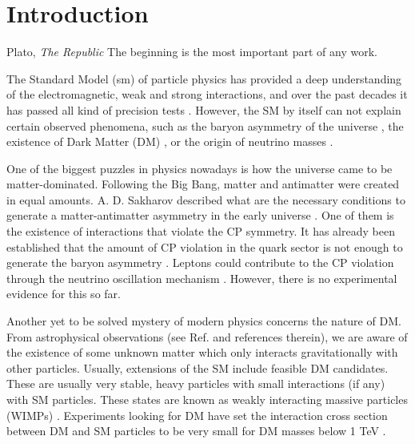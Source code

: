 \chapter{Introduction}
\label{chapter:introduction}


\begin{chapquote}{Plato, \textit{The Republic}}
	The beginning is the most important part of any work.
\end{chapquote}

The Standard Model (\gls{sm}) of particle physics \cite{Glashow1961,Weinberg1967,Salam1968} has provided a deep understanding of the electromagnetic, weak and strong interactions, and over the past decades it has passed all kind of precision tests \cite{Erler2019}. However, the SM by itself can not explain certain observed phenomena, such as the baryon asymmetry of the universe \cite{Canetti2012}, the existence of Dark Matter (DM) \cite{Bertone2004}, or the origin of neutrino masses \cite{King2014}.

One of the biggest puzzles in physics nowadays is how the universe came to be matter-dominated. Following the Big Bang, matter and antimatter were created in equal amounts. A. D. Sakharov described what are the necessary conditions to generate a matter-antimatter asymmetry in the early universe \cite{Sakharov1967}. One of them is the existence of interactions that violate the CP symmetry. It has already been established that the amount of CP violation in the quark sector is not enough to generate the baryon asymmetry \cite{Gavela1993}. Leptons could contribute to the CP violation through the neutrino oscillation mechanism \cite{Akhmedov1998}. However, there is no experimental evidence for this so far.

Another yet to be solved mystery of modern physics concerns the nature of DM. From astrophysical observations (see Ref. \cite{Bertone2004} and references therein), we are aware of the existence of some unknown matter which only interacts gravitationally with other particles. Usually, extensions of the SM include feasible DM candidates. These are usually very stable, heavy particles with small interactions (if any) with SM particles. These states are known as weakly interacting massive particles (WIMPs) \cite{Lee1977,Jungman1995}. Experiments looking for DM have set the interaction cross section between DM and SM particles to be very small for DM masses below 1 TeV \cite{Arcadi2024}.

